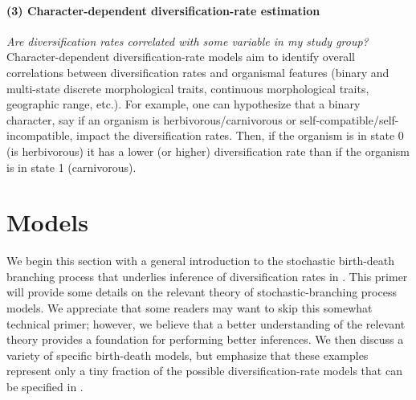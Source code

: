 \paragraph{(3) Character-dependent diversification-rate estimation}\textit{Are diversification rates correlated with some variable in my study group?}
Character-dependent diversification-rate models aim to identify overall correlations between diversification rates and organismal features (binary and multi-state discrete morphological traits, continuous morphological traits, geographic range, etc.).
For example, one can hypothesize that a binary character, say if an organism is herbivorous/carnivorous or self-compatible/self-incompatible, impact the diversification rates.
Then, if the organism is in state 0 (\EG is herbivorous) it has a lower (or higher) diversification rate than if the organism is in state 1 (\EG carnivorous).




\section{Models}\label{sec:Models}

We begin this section with a general introduction to the stochastic birth-death branching process that underlies inference of diversification rates in \RevBayes.
This primer will provide some details on the relevant theory of stochastic-branching process models.
We appreciate that some readers may want to skip this somewhat technical primer; however, we believe that a better understanding of the relevant theory provides a foundation for performing better inferences.
We then discuss a variety of specific birth-death models, but emphasize that these examples represent only a tiny fraction of the possible diversification-rate models that can be specified in \RevBayes.

